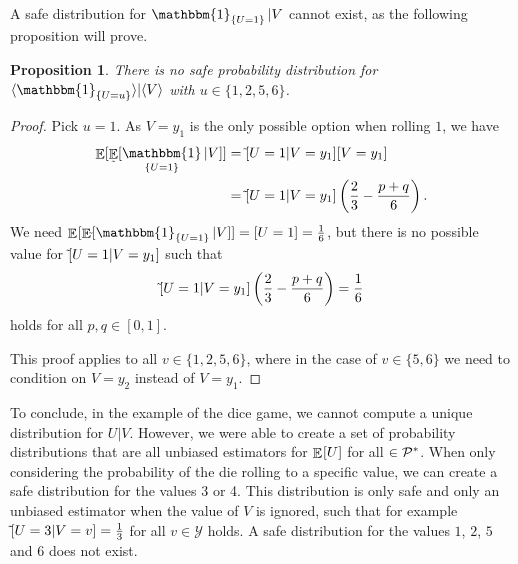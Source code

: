 \documentclass[twoside,a4paper]{report}
\theoremstyle{plain}
\newtheorem{proposition}[theorem]{Proposition}
\theoremstyle{definition}
\theoremstyle{remark}
\numberwithin{equation}{chapter}
\let\P\relax
\DeclareMathOperator{\P}{\mathbb{P}}
\DeclareMathOperator{\E}{\mathbb{E}}
\DeclareMathOperator{\1}{\mathbbm{1}}
\newcommand{\Y}{\mathcal{Y}}
\newcommand{\Pmod}{\mathcal{P}^*}
\newcommand{\Psafe}{\tilde{\P}}
\begin{document}
A safe distribution for $\1_{\{U=1\}}|V$ cannot exist, as the following proposition will prove.

\begin{proposition}
There is no safe probability distribution for $\langle\1_{\{U=u\}}\rangle|\langle V\rangle$ with $u\in\{1,2,5,6\}$.
\end{proposition}
\begin{proof}
Pick $u=1$. As $V=y_1$ is the only possible option when rolling $1$, we have
\begin{align}
\E_{\P}[\E_{\Psafe}[\1_{\{U=1\}}|V]]&=\Psafe[U=1|V=y_1]\P[V=y_1]\\
&=\Psafe[U=1|V=y_1]\left(\frac{2}{3}-\frac{p+q}{6}\right).
\end{align}
We need $\E_{\P}[\E_{\Psafe}[\1_{\{U=1\}}|V]]=\P[U=1]=\frac{1}{6}$, but there is no possible value for $\Psafe[U=1|V=y_1]$ such that 
\begin{equation}
\Psafe[U=1|V=y_1]\left(\frac{2}{3}-\frac{p+q}{6}\right)=\frac{1}{6}
\end{equation}
holds for all $p,q\in[0,1]$.

This proof applies to all $v\in\{1,2,5,6\}$, where in the case of $v\in\{5,6\}$ we need to condition on $V=y_2$ instead of $V=y_1$. 
\end{proof}


To conclude, in the example of the dice game, we cannot compute a unique distribution for $U|V$. However, we were able to create a set of probability distributions that are all unbiased estimators for $\E_{\P}[U]$ for all $\P\in\Pmod$. When only considering the probability of the die rolling to a specific value, we can create a safe distribution for the values 3 or 4. This distribution is only safe and only an unbiased estimator when the value of $V$ is ignored, such that for example $\Psafe[U=3|V=v]=\frac{1}{3}$ for all $v\in\Y$ holds. A safe distribution for the values $1$, $2$, $5$ and $6$ does not exist.
\end{document}
